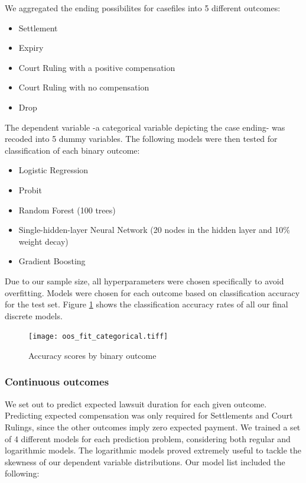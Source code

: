 \documentclass[]{article}
\begin{document}
We aggregated the ending possibilites for casefiles into 5 different
outcomes:

\begin{itemize}
\item
  Settlement
\item
  Expiry
\item
  Court Ruling with a positive compensation
\item
  Court Ruling with no compensation
\item
  Drop
\end{itemize}

The dependent variable -a categorical variable depicting the case
ending- was recoded into 5 dummy variables. The following models were
then tested for classification of each binary outcome:

\begin{itemize}
\item Logistic Regression

\item Probit

\item Random Forest (100 trees)

\item Single-hidden-layer Neural Network (20 nodes in the hidden layer and 10\% weight decay)

\item Gradient Boosting
\end{itemize}

Due to our sample size, all hyperparameters were chosen specifically to
avoid overfitting. Models were chosen for each outcome based on
classification accuracy for the test set. Figure \ref{accuracy_scores} shows the classification accuracy rates of all our final discrete models.

\begin{figure}[H]
   \caption{Accuracy scores by binary outcome}
   \label{accuracy_scores}
    \begin{center}
    \texttt{[image: oos\_fit\_categorical.tiff]}
    \end{center}
\end{figure}

\subsubsection{Continuous outcomes}\label{continuous-outcomes}

We set out to predict expected lawsuit duration for each given outcome.
Predicting expected compensation was only required for Settlements and
Court Rulings, since the other outcomes imply zero expected payment. We
trained a set of 4 different models for each prediction problem,
considering both regular and logarithmic models. The logarithmic models
proved extremely useful to tackle the skewness of our dependent variable
distributions. Our model list included the following:
\end{document}
